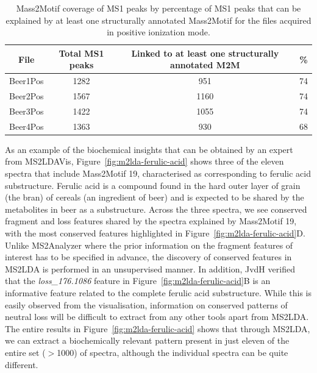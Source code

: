\begin{table}
\begin{centering}
\begin{tabular}{|c|c|c|c|}
\hline 
File & Total MS1 peaks & Linked to at least one structurally annotated M2M & \%\tabularnewline
\hline 
\hline 
Beer1Pos & 1282 & 951 & 74\tabularnewline
\hline 
Beer2Pos & 1567 & 1160 & 74\tabularnewline
\hline 
Beer3Pos & 1422 & 1055 & 74\tabularnewline
\hline 
Beer4Pos & 1363 & 930 & 68\tabularnewline
\hline 
\end{tabular}
\par\end{centering}
\caption{Mass2Motif coverage of MS1 peaks by percentage of MS1 peaks that can
be explained by at least one structurally annotated Mass2Motif for
the files acquired in positive ionization mode.\label{tab:ms2lda-coverage}}
\end{table}

As an example of the biochemical insights that can be obtained by an expert from MS2LDAVis, Figure~\ref{fig:m2lda-ferulic-acid} shows three of the eleven spectra that include Mass2Motif 19, characterised as corresponding to ferulic acid substructure. Ferulic acid is a compound found in the hard outer layer of grain (the bran) of cereals (an ingredient of beer) and is expected to be shared by the metabolites in beer as a substructure. Across the three spectra, we see conserved fragment and loss features shared by the spectra explained by Mass2Motif 19, with the most conserved features highlighted in Figure~\ref{fig:m2lda-ferulic-acid}D. Unlike MS2Analyzer \cite{ma2014ms2analyzer} where the prior information on the fragment features of interest has to be specified in advance, the discovery of conserved features in MS2LDA is performed in an unsupervised manner. In addition, JvdH verified that the \textit{loss_176.1086} feature in Figure~\ref{fig:m2lda-ferulic-acid}B is an informative feature related to the complete ferulic acid substructure. While this is easily observed from the visualisation, information on conserved patterns of neutral loss will be difficult to extract from any other tools apart from MS2LDA. The entire results in Figure~\ref{fig:m2lda-ferulic-acid} shows that through MS2LDA, we can extract a biochemically relevant pattern present in just eleven of the entire set ($>$1000) of spectra, although the individual spectra can be quite different. 

